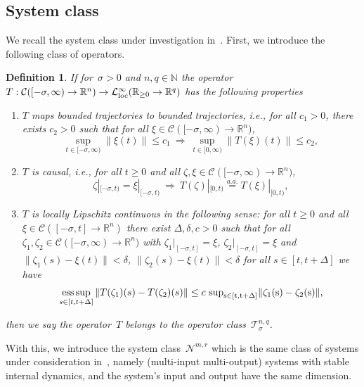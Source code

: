 \documentclass[ envcountsect, envcountsame]{svjour3}
\newtheorem{Definition}[Theorem]{Definition}
\newcommand{\R}{\mathbb{R}}
\newcommand{\N}{\mathbb{N}}
\newcommand{\cC}{\mathcal{C}}
\newcommand{\cL}{\mathcal{L}}
\newcommand{\cN}{\mathcal{N}}
\newcommand{\cT}{\mathcal{T}}
\newcommand{\rp}{\mathbb{R}_{\geq 0}}
\DeclareMathOperator{\esssup}{\rm ess\,sup}
\begin{document}
\subsection{System class} \label{Sec:System-class}
We recall the system class under investigation in~\cite{BergReis18b}.
First, %
we introduce the following class of operators. 
%
\begin{Definition} \label{Def:OP-T} %
If for~$\sigma > 0$ and $n,q \in \N$ the operator $T: \cC([-\sigma,\infty) \to \R^{n}) \to \cL_{\rm loc}^\infty(\rp \to \R^q)$ has the following properties
\begin{enumerate}[label = (\alph{enumi}), ref=(\alph{enumi}),leftmargin=*]
\item \label{T:BIBO}
 $T$ maps bounded trajectories to bounded trajectories, i.e., for all $c_1 > 0$, there exists $c_2>0$ such that for all 
$\xi \in \cC([-\sigma,\infty) \to \R^n)$,
\[
\sup_{t \in [-\sigma,\infty)} \| \xi(t) \| \le c_1 \ \Rightarrow \ \sup_{t \in [0,\infty)} \| T(\xi)(t) \| \le c_2,
\]
\item \label{T:causal}
$T$ is causal, i.e., for all $t \ge 0$ and all $\zeta, \xi \in \cC([-\sigma,\infty) \to \R^n)$, 
\[
\zeta |_{[-\sigma,t)} = \xi|_{[-\sigma,t)} \ \Rightarrow \ T(\zeta)|_{[0,t)} \overset{a.a.}{=} T(\xi)|_{[0,t)},
\]
\item \label{T:Lipschitz}
$T$ is locally Lipschitz continuous in the following sense: for all $t \ge 0 $ and all $\xi \in \cC([-\sigma,t] \to \R^n)$ 
there exist $\Delta, \delta, c > 0$ such that for all 
$\zeta_1, \zeta_2 \in \cC([-\sigma,\infty) \to \R^n)$ with $\zeta_1|_{[-\sigma,t]} = \xi $, $\zeta_2|_{[-\sigma,t]} = \xi $ 
and $\|\zeta_1(s) - \xi(t)\| < \delta$,  $\|\zeta_2(s) - \xi(t)\| < \delta$ for all $s \in [t,t+\Delta]$ we have
\[
\esssup_{s \in [t,t+\Delta]}\| T(\zeta_1)(s) - T(\zeta_2)(s) \| \le c \ \rm{sup}_{s \in [t,t+\Delta]} \| \zeta_1(s) - \zeta_2(s)\| ,
\]
\end{enumerate}
then we say the operator~$T$ belongs to the operator class~$\cT_\sigma^{n,q}$.
\end{Definition}
%
With this, we introduce the system class~$\cN^{m,r}$ which is the same class of systems under consideration in~\cite{BergReis18b}, namely (multi-input multi-output) systems with stable internal dynamics, and the system's input and output have the same dimension. 
\end{document}
